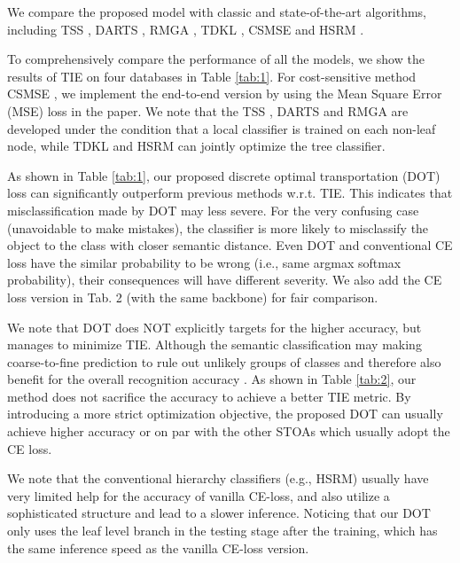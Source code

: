 \documentclass{article}
\theoremstyle{plain}%
\begin{document}
We compare the proposed model with classic and state-of-the-art algorithms, including TSS \cite{ceci2007classifying}, DARTS \cite{deng2012hedging}, RMGA \cite{wang2017local}, TDKL \cite{lee2018hierarchical}, CSMSE \cite{khan2017cost} and HSRM \cite{wang2020hierarchical}. 

To comprehensively compare the performance of all the models, we show the results of TIE on four databases in Table \ref{tab:1}. For cost-sensitive method CSMSE \cite{khan2017cost}, we implement the end-to-end version by using the Mean Square Error (MSE) loss in the paper. We note that the TSS \cite{ceci2007classifying}, DARTS \cite{deng2012hedging} and RMGA \cite{wang2017local} are developed under the condition that a local classifier is trained on each non-leaf node, while TDKL \cite{lee2018hierarchical} and HSRM \cite{wang2020hierarchical} can jointly optimize the tree classifier.






As shown in Table \ref{tab:1}, our proposed discrete optimal transportation (DOT) loss can significantly outperform previous methods w.r.t. TIE. This indicates that misclassification made by DOT may less severe. For the very confusing case (unavoidable to make mistakes), the classifier is more likely to misclassify the object to the class with closer semantic distance.  Even DOT and conventional CE loss have the similar probability to be wrong (i.e., same argmax softmax probability), their consequences will have different severity. We also add the CE loss version in Tab. 2 (with the same backbone) for fair comparison.

We note that DOT does NOT explicitly targets for the higher accuracy, but manages to minimize TIE. Although the semantic classification may making coarse-to-fine prediction to rule out unlikely groups of classes and therefore also benefit for the overall recognition accuracy \cite{zhao2018embedding}. As shown in Table \ref{tab:2}, our method does not sacrifice the accuracy to achieve a better TIE metric. By introducing a more strict optimization objective, the proposed DOT can usually achieve higher accuracy or on par with the other STOAs which usually adopt the CE loss. 

 
We note that the conventional hierarchy classifiers (e.g., HSRM) usually have very limited help for the accuracy of vanilla CE-loss, and also utilize a sophisticated structure and lead to a slower inference. Noticing that our DOT only uses the leaf level branch in the testing stage after the training, which has the same inference speed as the vanilla CE-loss version. %
\end{document}

